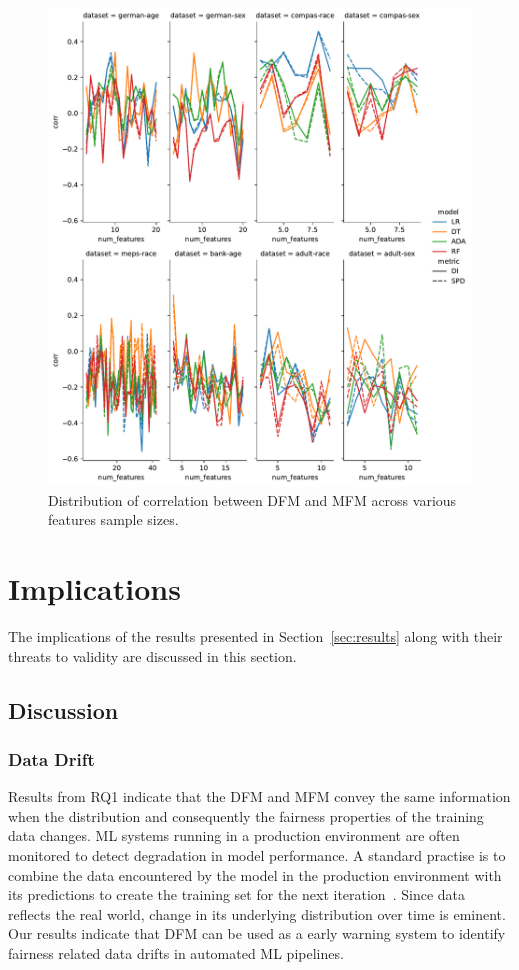 \documentclass[sigconf,review,anonymous]{acmart}
\begin{document}
\begin{figure}
  \centering
  \includegraphics[width=0.95\linewidth]{lineplot--num-features--corr.pdf}
  \caption{Distribution of correlation between DFM and MFM across
  various features sample sizes.}
  \label{fig:lineplot--num-features--corr}
\end{figure}

\section{Implications}\label{sec:implications}
The implications of the results presented in Section \ref{sec:results}
along with their threats to validity are discussed in this section.

\subsection{Discussion}\label{sec:discuss}
\subsubsection{Data Drift}\label{sec:discuss-data-drift}

Results from RQ1 indicate that the DFM and MFM convey the same
information when the distribution and consequently the fairness
properties of the training data changes. ML systems running in
a production environment are often monitored to detect degradation in
model performance. A standard practise is to combine the data
encountered by the model in the production environment with its
predictions to create the training set for the next
iteration \cite{biessmann2021automated}. Since data reflects the real
world, change in its underlying distribution over time is eminent. Our
results indicate that DFM can be used as a early warning system to
identify fairness related data drifts in automated ML pipelines.
\end{document}
